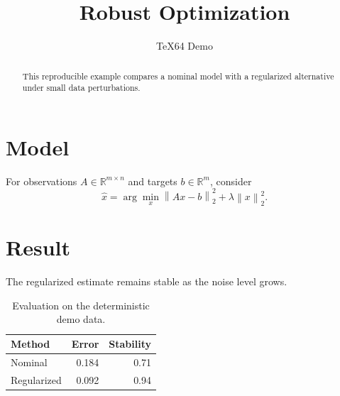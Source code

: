 \documentclass[11pt]{article}
\title{Robust Optimization}
\author{TeX64 Demo}
\date{}
\begin{document}
\maketitle

\begin{abstract}
This reproducible example compares a nominal model with a
regularized alternative under small data perturbations.
\end{abstract}

\section{Model}
For observations $A \in \mathbb{R}^{m \times n}$ and targets
$b \in \mathbb{R}^{m}$, consider
\begin{equation}
  \hat{x}
  = \arg\min_x
    \left\lVert Ax-b \right\rVert_2^2
    + \lambda \left\lVert x \right\rVert_2^2.
  \label{eq:model}
\end{equation}

\section{Result}
The regularized estimate remains stable as the noise level grows.

\begin{table}[h]
  \centering
  \begin{tabular}{lrr}
    \toprule
    Method & Error & Stability \\
    \midrule
    Nominal    & 0.184 & 0.71 \\
    Regularized & 0.092 & 0.94 \\
    \bottomrule
  \end{tabular}
  \caption{Evaluation on the deterministic demo data.}
\end{table}
\end{document}
